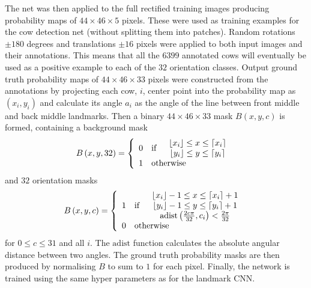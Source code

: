 \documentclass{cta-author}
\begin{document}
 The net was then applied to the full rectified training images producing probability maps of $44\times
46\times 5$ pixels. These were used as training examples for the cow detection net (without splitting them
into patches). Random rotations $\pm 180$ degrees and translations $\pm 16$ pixels were applied to both
input images and their annotations. This means that all the $6399$ annotated cows will eventually be used as
a positive example to each of the $32$ orientation classes. Output ground truth probability maps of $44\times
46\times 33$ pixels were constructed from the annotations by projecting each cow, $i$, center point into the
probability map as $\left( x_i, y_i \right)$ and calculate its angle $a_i$ as the angle of the line between
front middle and back middle landmarks. Then a binary $44\times 46\times 33$ mask $B\left( x, y, c \right)$
is formed, containing a background mask
\begin{equation}
B\left( x, y, 32 \right) = \left\lbrace
\begin{array}{clc}
0 & \text{if} &
\begin{array}{c}
 \lfloor x_i \rfloor \leq x \leq \lceil x_i \rceil \\
 \lfloor y_i \rfloor \leq y \leq \lceil y_i \rceil
\end{array}
\\
1 & \multicolumn{2}{l}{\text{otherwise}}
\end{array}
\right.
\end{equation}
and $32$ orientation masks
\begin{equation}
B\left( x, y, c \right) = \left\lbrace
\begin{array}{clc}
1 & \text{if} &
\begin{array}{c}
 \lfloor x_i \rfloor-1 \leq x \leq \lceil x_i \rceil+1 \\
 \lfloor y_i \rfloor-1 \leq y \leq \lceil y_i \rceil+1 \\
 \mathrm{adist}\left(\frac{2c\pi}{32}, c_i\right) < \frac{2\pi}{32} \\
\end{array}
\\
0 & \multicolumn{2}{l}{\text{otherwise}}
\end{array}
\right.
\end{equation}
for $0\leq c \leq 31$ and all $i$. The $\mathrm{adist}$ function calculates the absolute angular distance
between two angles. The ground truth probability masks are then produced by normalising $B$ to sum to $1$ for
each pixel. Finally, the network is trained using the same hyper parameters as for the landmark CNN.
\end{document}
